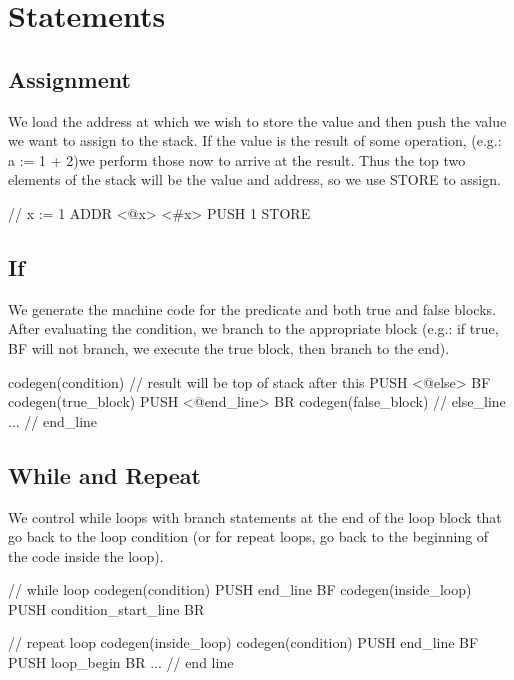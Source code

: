 \section{Statements}
\subsection{Assignment}

We load the address at which we wish to store the value and then push the value
we want to assign to the stack. If the value is the result of some operation, 
(e.g.: a := 1 + 2)we perform those now to arrive at the result. Thus the top two 
elements of the stack will be the value and address, so we use STORE to assign.

\begin{code}[Assignment]
// x := 1
ADDR <@x> <#x>
PUSH 1
STORE
\end{code}

\subsection{If}

We generate the machine code for the predicate and both true and false blocks.
After evaluating the condition, we branch to the appropriate block (e.g.: if true,
BF will not branch, we execute the true block, then branch to the end).

\begin{code}[IfStatement]
codegen(condition)      // result will be top of stack after this
PUSH <@else>
BF   
codegen(true_block)             
PUSH <@end_line> 
BR           
codegen(false_block)    // else_line
...                     // end_line
\end{code}

\subsection{While and Repeat}

We control while loops with branch statements at the end of the loop block that go
back to the loop condition (or for repeat loops, go back to the beginning of the
code inside the loop).

\begin{code}[Loops]
// while loop
codegen(condition)
PUSH end_line
BF 
codegen(inside_loop)
PUSH condition_start_line
BR 

// repeat loop
codegen(inside_loop)
codegen(condition)
PUSH end_line
BF
PUSH loop_begin
BR
...                 // end line
\end{code}

